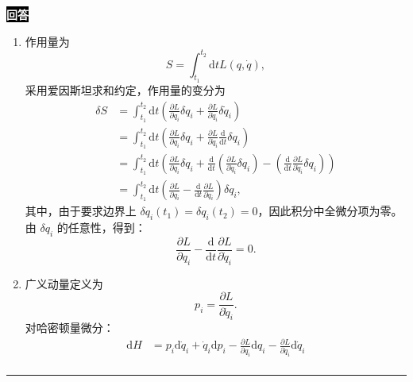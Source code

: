 \documentclass[11pt,a4paper]{ctexart}
\newenvironment{answer}
  {\par\smallskip\noindent
   \begingroup
   \setlength{\fboxsep}{4pt}%
   \colorbox{black}{\textcolor{white}{\bfseries 回答}}%
   \endgroup
   \quad\ignorespaces}
  {\par\smallskip\noindent\rule{\linewidth}{0.4pt}\medskip}
\begin{document}
\begin{answer}
  \begin{enumerate}[label=(1.4.\arabic*),ref=1.4.\arabic*,leftmargin=4.5em]
    \item 作用量为
    \begin{equation}
      S = \int_{t_1}^{t_2}\mathrm{d}t L\left(q,\dot{q} \right),
    \end{equation}
    采用爱因斯坦求和约定，作用量的变分为
    \begin{equation}
      \begin{aligned}
        \delta S
        &=\int_{t_1}^{t_2}\mathrm{d}t \left(\frac{\partial L }{\partial q_i }\delta q_i + \frac{\partial L }{\partial \dot{q}_i }\delta \dot{q}_i   \right) \\
        &=\int_{t_1}^{t_2}\mathrm{d}t \left(\frac{\partial L }{\partial q_i }\delta q_i + \frac{\partial L }{\partial \dot{q}_i } \frac{\mathrm{d} }{\mathrm{d}t }  \delta q_i  \right) \\
        &=\int_{t_1}^{t_2}\mathrm{d}t \left(\frac{\partial L }{\partial q_i }\delta q_i + \frac{\mathrm{d} }{\mathrm{d}t } \left(\frac{\partial L }{\partial \dot{q}_i } \delta q_i \right) - \left(\frac{\mathrm{d} }{\mathrm{d}t } \frac{\partial L }{\partial \dot{q}_i } \delta q_i  \right) \right) \\
        &=\int_{t_1}^{t_2}\mathrm{d}t \left(\frac{\partial L }{\partial q_i } - \frac{\mathrm{d} }{\mathrm{d}t }\frac{\partial L }{\partial \dot{q}_i }    \right) \delta q_i,
      \end{aligned}
    \end{equation}
    其中，由于要求边界上 $\delta q_i(t_1)=\delta q_i(t_2)=0 $，因此积分中全微分项为零。由 $\delta q_i $ 的任意性，得到：
    \begin{equation}
      \frac{\partial L }{\partial q_i } - \frac{\mathrm{d} }{\mathrm{d}t } \frac{\partial L }{\partial \dot{q}_i }
      =0.  
    \end{equation}
    \item 广义动量定义为
    \begin{equation}
      p_i
      =\frac{\partial L }{\partial \dot{q}_i }. 
    \end{equation}
    对哈密顿量微分：
    \begin{equation}
      \begin{aligned}
        \mathrm{d}H
        &=p_i\mathrm{d}\dot{q}_i + \dot{q}_i\mathrm{d}p_i - \frac{\partial L }{\partial q_i }\mathrm{d}q_i - \frac{\partial L }{\partial \dot{q}_i } \mathrm{d}\dot{q}_i \\

\end{aligned}
\end{equation}
\end{enumerate}
\end{answer}
\end{document}
